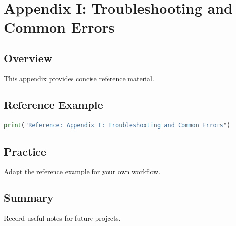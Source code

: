 \chapter{Appendix I: Troubleshooting and Common Errors}
\label{chap:vol12-9}



\section{Overview}
This appendix provides concise reference material.

\section{Reference Example}
\begin{lstlisting}[language=Python]
print("Reference: Appendix I: Troubleshooting and Common Errors")
\end{lstlisting}

\section{Practice}
\begin{exercise}
Adapt the reference example for your own workflow.
\end{exercise}

\section{Summary}
Record useful notes for future projects.
